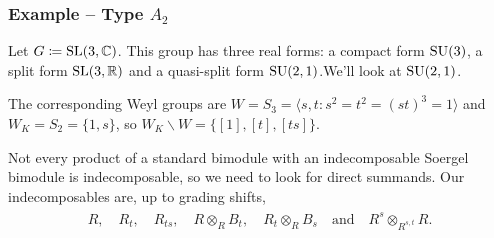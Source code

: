 \documentclass{beamer}
\begin{document}
\begin{frame}
\frametitle{Example -- Type $A_2$}
\noindent Let $G \coloneqq \textup{SL}(3, \mathbb{C})$. This group has three real forms: a compact form $\textup{SU}(3)$, a split form $\textup{SL}(3, \mathbb{R})$ and a quasi-split form $\textup{SU}(2, 1)$.\newline We'll look at $\textup{SU}(2, 1)$.\newline

\noindent The corresponding Weyl groups are $W = S_3 = \langle s, t : s^2 = t^2 = (st)^3 = 1\rangle$ and $W_K = S_2 = \{1, s\}$, so $W_K\backslash W = \{[1], [t], [ts]\}$.\newline

\noindent Not every product of a standard bimodule with an indecomposable Soergel bimodule is indecomposable, so we need to look for direct summands. Our indecomposables are, up to grading shifts,
\begin{align*}
\begin{split}
R,\quad R_t,\quad R_{ts},\quad R \otimes_R B_t,\quad R_t \otimes_R B_s\quad\text{and}\quad R^s \otimes_{R^{s,t}} R.
\end{split}
\end{align*}



\end{frame}
\end{document}
